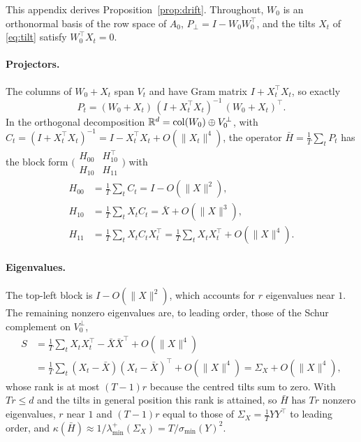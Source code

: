This appendix derives Proposition~\ref{prop:drift}. Throughout, $W_0$ is an
orthonormal basis of the row space of $A_0$, $P_\perp = I - W_0W_0^\top$, and
the tilts $X_t$ of \eqref{eq:tilt} satisfy $W_0^\top X_t = 0$.

\paragraph{Projectors.} The columns of $W_0 + X_t$ span $V_t$ and have Gram
matrix $I + X_t^\top X_t$, so exactly
\[
  P_t = (W_0 + X_t)\,(I + X_t^\top X_t)^{-1}\,(W_0 + X_t)^\top .
\]
In the orthogonal decomposition $\mathbb{R}^d = \operatorname{col}(W_0) \oplus V_0^\perp$,
with $C_t = (I + X_t^\top X_t)^{-1} = I - X_t^\top X_t + O(\|X_t\|^4)$, the
operator $\bar H = \frac1T\sum_t P_t$ has the block form
$\bigl(\begin{smallmatrix} H_{00} & H_{10}^\top \\ H_{10} & H_{11}
\end{smallmatrix}\bigr)$ with
\begin{align*}
  H_{00} &= \tfrac1T\textstyle\sum_t C_t = I - O(\|X\|^2), \\
  H_{10} &= \tfrac1T\textstyle\sum_t X_t C_t = \bar X + O(\|X\|^3), \\
  H_{11} &= \tfrac1T\textstyle\sum_t X_t C_t X_t^\top
          = \tfrac1T\textstyle\sum_t X_t X_t^\top + O(\|X\|^4).
\end{align*}

\paragraph{Eigenvalues.} The top-left block is $I - O(\|X\|^2)$, which
accounts for $r$ eigenvalues near $1$. The remaining nonzero eigenvalues are,
to leading order, those of the Schur complement on $V_0^\perp$,
\begin{align*}
  S &= \tfrac1T\textstyle\sum_t X_tX_t^\top - \bar X\bar X^\top + O(\|X\|^4) \\
    &= \tfrac1T\textstyle\sum_t (X_t - \bar X)(X_t - \bar X)^\top + O(\|X\|^4)
     = \Sigma_X + O(\|X\|^4),
\end{align*}
whose rank is at most $(T-1)r$ because the centred tilts sum to zero. With
$Tr \le d$ and the tilts in general position this rank is attained, so
$\bar H$ has $Tr$ nonzero eigenvalues, $r$ near $1$ and $(T-1)r$ equal to those
of $\Sigma_X = \tfrac1T YY^\top$ to leading order, and
$\kappa(\bar H) \approx 1/\lambda^{+}_{\min}(\Sigma_X) = T/\sigma_{\min}(Y)^2$.

